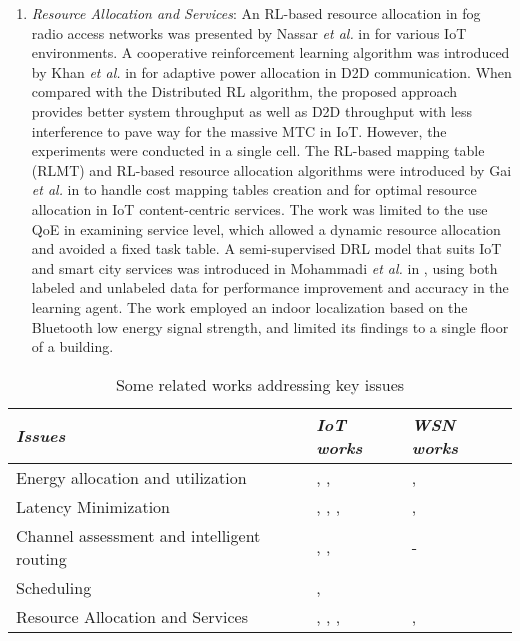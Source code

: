 \documentclass[journal]{IEEEtran}
\begin{document}
\begin{enumerate}[leftmargin=*,label= \arabic*)]
      \item \textit{Resource Allocation and Services}: An RL-based resource allocation in fog radio access networks was presented by Nassar \emph{et al.} in \cite{Nassar} for various IoT environments. A cooperative reinforcement learning algorithm was introduced by Khan \emph{et al.} in \cite{Khan2018} for adaptive power allocation in D2D communication. When compared with the Distributed RL algorithm, the proposed approach provides better system throughput as well as D2D throughput with less interference to pave way for the massive MTC in IoT. However, the experiments were conducted in a single cell. The RL-based mapping table (RLMT) and RL-based resource allocation algorithms were introduced  by Gai \emph{et al.} in \cite{Gai2018} to handle cost mapping tables creation and for optimal resource allocation in IoT content-centric services. The work was limited to the use QoE in examining service level, which allowed a dynamic resource allocation and avoided a fixed task table. A semi-supervised DRL model that suits IoT and smart city services was introduced in Mohammadi \emph{et al.} in \cite{Mohammadi2018}, using both labeled and unlabeled data for performance improvement and accuracy in the learning agent. The work employed an indoor localization based on the Bluetooth low energy signal strength, and limited its findings to a single floor of a building.



    \end{enumerate}


\begin{table}
\small
\centering
\caption{Some related works addressing key issues}
\label{table:refissues}
\begin{tabular}{lll}
  \hline
 \textit{Issues} & \textit{IoT works} & \textit{WSN works} \\
  \hline \hline
   \multicolumn{1}{m{3cm}}{Energy allocation and utilization} &\multicolumn{1}{m{3cm}}{ \cite{Zhong2018}, \cite{Conti2017}, \cite{Debizet2018} }& \multicolumn{1}{m{3cm}}{ \cite{Chen2008}, \cite{Chen2011}}\\ \hline
   \multicolumn{1}{m{3cm}}{Latency Minimization} &\multicolumn{1}{m{3cm}}{ \cite{Mai2018}, \cite{Li2014}, \cite{Liu2017}, \cite{routray2017}}&\multicolumn{1}{m{3cm}}{ \cite{Liang2009}, \cite{Chen2009} }  \\ \hline
   \multicolumn{1}{m{3cm}}{Channel assessment and intelligent routing } & \multicolumn{1}{m{3cm}}{ \cite{Jadoon2017}, \cite{Camelo2016}, \cite{Li2015}}&  \multicolumn{1}{m{3cm}}{\cite{Forster2007}-\cite{Forster2009}}\\ \hline
   \multicolumn{1}{m{3cm}}{Scheduling} & \multicolumn{1}{m{3cm}}{\cite{Wen15}, \cite{Zhu2018}} &  \cite{Mihaylov}   \\ \hline
   \multicolumn{1}{m{3cm}}{Resource Allocation and Services }& \multicolumn{1}{m{3cm}}{\cite{Nassar}, \cite{Khan2018}, \cite{Gai2018}, \cite{Mohammadi2018}}& \multicolumn{1}{m{3cm}}{\cite{Shah2007}, \cite{Shah2013}}\\
   \hline \hline
 \end{tabular}
 \end{table}
\end{document}
